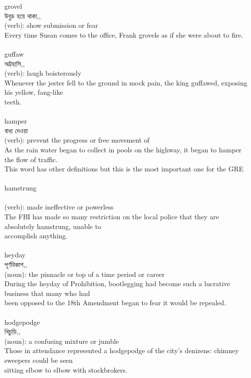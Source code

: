 \documentclass{article}
\begin{document}
{grovel}\\
{উবুড় হয়ে থাকা,,}\\
{(verb): show submission or fear\\Every time Susan comes to the office, Frank grovels as if she were about to fire.\\}\\
{guffaw}\\
{অট্টহাসি,,}\\
{(verb): laugh boisterously\\Whenever the jester fell to the ground in mock pain, the king guffawed, exposing his yellow, fang-like\\teeth.\\}\\
{hamper}\\
{বাধা দেওয়া}\\
{(verb): prevent the progress or free movement of\\As the rain water began to collect in pools on the highway, it began to hamper the flow of traffic.\\This word has other definitions but this is the most important one for the GRE\\}\\
{hamstrung}\\
{}\\
{(verb): made ineffective or powerless\\The FBI has made so many restriction on the local police that they are absolutely hamstrung, unable to\\accomplish anything.\\}\\
{heyday}\\
{পূর্ণবিকাশ,,}\\
{(noun): the pinnacle or top of a time period or career\\During the heyday of Prohibition, bootlegging had become such a lucrative business that many who had\\been opposed to the 18th Amendment began to fear it would be repealed.\\}\\
{hodgepodge}\\
{খিচুড়ি,,}\\
{(noun): a confusing mixture or jumble\\Those in attendance represented a hodgepodge of the city's denizens: chimney sweepers could be seen\\sitting elbow to elbow with stockbrokers.\\}\\
\end{document}
